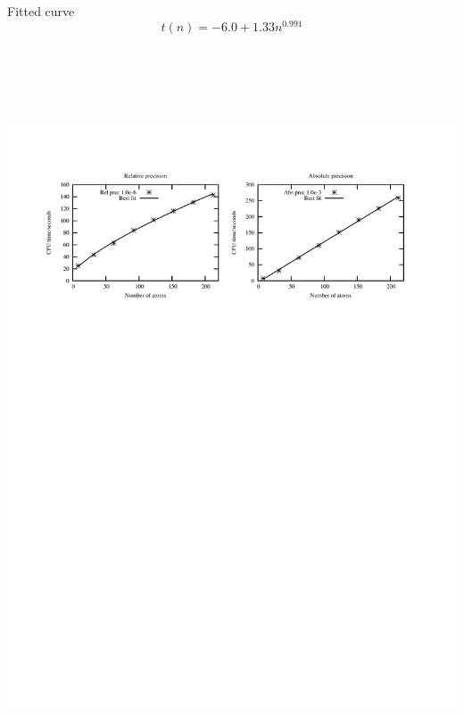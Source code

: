 \begin{frame}
\begin{columns}
\begin{column}{.50\textwidth}
\begin{figure}
	\end{figure}
	Fitted curve
	\begin{equation}
	    \nonumber
	    t(n) = -6.0 + 1.33n^{0.991}
	\end{equation}
	\ \\
	\ \\
    \end{column}
    \end{columns}    
    \ \\
    \begin{center}
	\includegraphics[scale=0.6, clip, viewport = 50 550 540 730]{figures/linearScaling.pdf}
    \end{center}
\end{frame}


